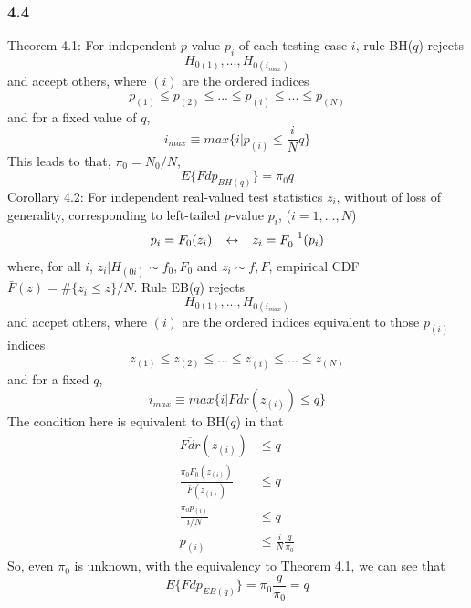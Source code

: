 \documentclass{article}
\begin{document}
\subsubsection*{4.4}
Theorem 4.1: \newline
For independent $p$-value $p_i$ of each testing case $i$, rule BH($q$) rejects
\begin{displaymath}
H_{0(1)}, ... , H_{0(i_{max})}
\end{displaymath}
and accept others, where $(i)$ are the ordered indices
\begin{displaymath}
p_{(1)} \leq p_{(2)} \leq ... \leq p_{(i)} \leq ... \leq p_{(N)}
\end{displaymath}
and for a fixed value of $q$,
\begin{displaymath}
i_{max} \equiv max\{i | p_{(i)} \leq \frac{i}{N}q  \}
\end{displaymath}
This leads to that, $\pi_0 = N_0 / N$,
\begin{displaymath}
E\{ Fdp_{BH(q)} \} = \pi_0q
\end{displaymath}
Corollary 4.2:\newline
For independent real-valued test statistics $z_i$, without of loss of
generality, corresponding to left-tailed $p$-value $p_i$, ($i=1,...,N$)
\begin{displaymath}
p_i = F_0(z_i) \hspace{8 pt} \leftrightarrow \hspace{8 pt} z_i = F_0^{-1}(p_i)
\end{displaymath}
where, for all $i$, $z_i | H_{(0i)} \sim f_0, F_0$ and $z_i \sim f, F$, 
empirical CDF $\bar{F}(z) = \# \{z_i\leq z \}/N$.\newline
Rule EB($q$) rejects
\begin{displaymath}
H_{0(1)}, ... , H_{0(i_{max})}
\end{displaymath}
and accpet others, where $(i)$ are the ordered indices equivalent to those $p_{(i)}$ indices
\begin{displaymath}
z_{(1)} \leq z_{(2)} \leq ... \leq z_{(i)} \leq ... \leq z_{(N)}
\end{displaymath}
and for a fixed $q$,
\begin{displaymath}
i_{max} \equiv max\{ i | \overline{Fdr}(z_{(i)}) \leq q \}
\end{displaymath}
The condition here is equivalent to BH($q$) in that
\begin{displaymath}
\begin{split}
\overline{Fdr}(z_{(i)}) &\leq q \\
\frac{\pi_0F_0(z_{(i)})}{\bar{F}(z_{(i)})} &\leq q \\
\frac{\pi_0p_{(i)}}{i/N} &\leq q \\
p_{(i)} &\leq \frac{i}{N} \frac{q}{\pi_0}
\end{split}
\end{displaymath}
So, even $\pi_0$ is unknown, with the equivalency to Theorem
4.1, we can see that
\begin{displaymath}
E\{ Fdp_{EB(q)} \} = \pi_0 \frac{q}{\pi_0} = q
\end{displaymath}
\end{document}
